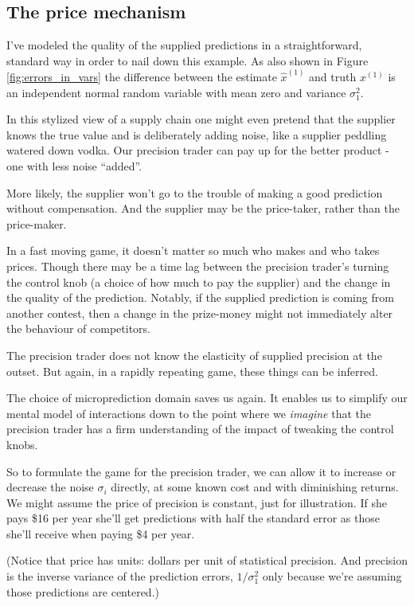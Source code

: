 \subsection{The price mechanism}


I've modeled the quality of the supplied predictions in a straightforward, standard way in order to nail down this example. As also shown in Figure \ref{fig:errors_in_vars} the difference between the estimate $\hat{x}^{(1)}$ and truth  $x^{(1)}$ is an independent normal random variable with mean zero and variance $\sigma_1^2$. 

In this stylized view of a supply chain one might even pretend that the supplier knows the true value and is deliberately adding noise, like a supplier peddling watered down vodka. Our precision trader can pay up for the better product - one with less noise ``added''. 

More likely, the supplier won't go to the trouble of making a good prediction without compensation. And the supplier may be the price-taker, rather than the price-maker. 

In a fast moving game, it doesn't matter so much who makes and who takes prices. Though there may be a time lag between the precision trader's turning the control knob (a choice of how much to pay the supplier) and the change in the quality of the prediction. Notably, if the supplied prediction is coming from another contest, then a change in the prize-money might not immediately alter the behaviour of competitors. 

The precision trader does not know the elasticity of supplied precision at the outset. But again, in a rapidly repeating game, these things can be inferred.  

The choice of microprediction domain saves us again. It enables us to simplify our mental model of interactions down to the point where we {\em imagine} that the precision trader has a firm understanding of the impact of tweaking the control knobs. 

So to formulate the game for the precision trader, we can allow it to increase or decrease the noise $\sigma_i$ directly, at some known cost and with diminishing returns. We might assume the price of precision is constant, just for illustration. If she pays \$16 per year she'll get predictions with half the standard error as those she'll receive when paying \$4 per year.


(Notice that price has units: dollars per unit of statistical precision. And precision is the inverse variance of the prediction errors, $1/\sigma_1^2$ only because we're assuming those predictions are centered.)


